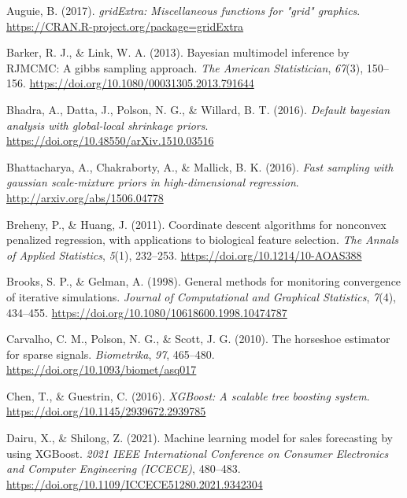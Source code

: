 \documentclass[
  11pt,
]{article}
\newlength{\cslhangindent}
\newlength{\cslentryspacingunit} %
\newenvironment{CSLReferences}[2] %
 {%
  \setlength{\parindent}{0pt}
  \ifodd #1
  \let\oldpar\par
  \def\par{\hangindent=\cslhangindent\oldpar}
  \fi
  \setlength{\parskip}{#2\cslentryspacingunit}
 }%
 {}
\begin{document}
\hypertarget{refs}{}
\begin{CSLReferences}{1}{0}
\leavevmode{}%
Auguie, B. (2017). \emph{gridExtra: Miscellaneous functions for "grid"
graphics}. \url{https://CRAN.R-project.org/package=gridExtra}

\leavevmode{}%
Barker, R. J., \& Link, W. A. (2013). Bayesian multimodel inference by
RJMCMC: A gibbs sampling approach. \emph{The American Statistician},
\emph{67}(3), 150--156.
\url{https://doi.org/10.1080/00031305.2013.791644}

\leavevmode{}%
Bhadra, A., Datta, J., Polson, N. G., \& Willard, B. T. (2016).
\emph{Default bayesian analysis with global-local shrinkage priors}.
\url{https://doi.org/10.48550/arXiv.1510.03516}

\leavevmode{}%
Bhattacharya, A., Chakraborty, A., \& Mallick, B. K. (2016). \emph{Fast
sampling with gaussian scale-mixture priors in high-dimensional
regression}. \url{http://arxiv.org/abs/1506.04778}

\leavevmode{}%
Breheny, P., \& Huang, J. (2011). {Coordinate descent algorithms for
nonconvex penalized regression, with applications to biological feature
selection}. \emph{The Annals of Applied Statistics}, \emph{5}(1),
232--253. \url{https://doi.org/10.1214/10-AOAS388}

\leavevmode{}%
Brooks, S. P., \& Gelman, A. (1998). General methods for monitoring
convergence of iterative simulations. \emph{Journal of Computational and
Graphical Statistics}, \emph{7}(4), 434--455.
\url{https://doi.org/10.1080/10618600.1998.10474787}

\leavevmode{}%
Carvalho, C. M., Polson, N. G., \& Scott, J. G. (2010). The horseshoe
estimator for sparse signals. \emph{Biometrika}, \emph{97}, 465--480.
\url{https://doi.org/10.1093/biomet/asq017}

\leavevmode{}%
Chen, T., \& Guestrin, C. (2016). \emph{XGBoost: A scalable tree
boosting system}. \url{https://doi.org/10.1145/2939672.2939785}

\leavevmode{}%
Dairu, X., \& Shilong, Z. (2021). Machine learning model for sales
forecasting by using XGBoost. \emph{2021 IEEE International Conference
on Consumer Electronics and Computer Engineering (ICCECE)}, 480--483.
\url{https://doi.org/10.1109/ICCECE51280.2021.9342304}


\end{CSLReferences}
\end{document}
